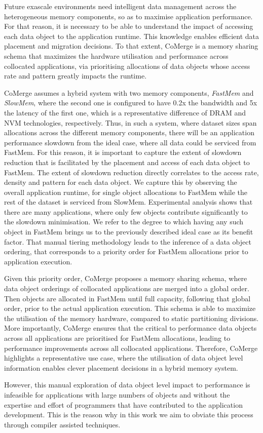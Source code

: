 Future exascale environments need intelligent data management across the heterogeneous memory components, so as to maximise application performance.
For that reason, it is necessary to be able to understand the impact of accessing each data object to the application runtime.
This knowledge enables efficient data placement and migration decisions.
To that extent, CoMerge \cite{Doudali:2017:CTE:3132402.3132418} is a memory sharing schema that maximizes the hardware utilisation and performance across collocated applications, via prioritising allocations of data objects whose access rate and pattern greatly impacts the runtime.
 
CoMerge assumes a hybrid system with two memory components, \textit{FastMem} and \textit{SlowMem}, where the second one is configured to have 0.2x the bandwidth and 5x the latency of the first one, which is a representative difference of DRAM and \ac{NVM} technologies, respectively.
Thus, in such a system, where dataset sizes span allocations across the different memory components, there will be an application performance slowdown from the ideal case, where all data could be serviced from FastMem.
For this reason, it is important to capture the extent of slowdown reduction that is facilitated by the placement and access of each data object to FastMem.
The extent of slowdown reduction directly correlates to the access rate, density and pattern for each data object.
We capture this by observing the overall application runtime, for single object allocations to FastMem while the rest of the dataset is serviced from SlowMem.
Experimental analysis shows that there are many applications, where only few objects contribute significantly to the slowdown minimisation.
We refer to the degree to which having any such object in FastMem brings us to the previously described ideal case as its benefit factor.
That manual tiering methodology leads to the inference of a data object ordering, that corresponds to a priority order for FastMem allocations prior to application execution.

Given this priority order, CoMerge proposes a memory sharing schema, where data object orderings of collocated applications are merged into a global order.
Then objects are allocated in FastMem until full capacity, following that global order, prior to the actual application execution.
This schema is able to maximize the utilisation of the memory hardware, compared to static partitioning divisions.
More importantly, CoMerge ensures that the critical to performance data objects across all applications are prioritised for FastMem allocations, leading to performance improvements across all collocated applications.
Therefore, CoMerge highlights a representative use case, where the utilisation of data object level information enables clever placement decisions in a hybrid memory system.

However, this manual exploration of data object level impact to performance is infeasible for applications with large numbers of objects and without the expertise and effort of programmers that have contributed to the application development.
This is the reason why in this work we aim to obviate this process through compiler assisted techniques.
